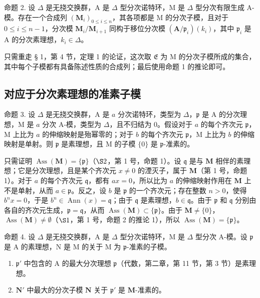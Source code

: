 命题 2. 设 \(\Delta\) 是无挠交换群，A 是 \(\Delta\) 型分次诺特环，M 是 \(\Delta\) 型分次有限生成 A-模。存在一个合成列 \((\mathbf{M}_i)_{0 \leqslant i \leqslant n}\)，其各项都是 M 的分次子模，且对于 \(0 \leqslant i \leqslant n - 1\)，分次模 \(\mathbf{M}_i / \mathbf{M}_{i+1}\) 同构于移位分次模 \((\mathbf{A} / \mathfrak{p}_i)(k_i)\)，其中 \(\mathfrak{p}_i\) 是 A 的分次素理想，\(k_i \in \Delta\)。

只需重走 § 1，第 4 节，定理 1 的论证，这次取 \(\mathfrak{E}\) 为 M 的分次子模所成的集合，其中每个子模都有具备陈述性质的合成列；最后使用命题 1 的推论即可。

\subsection{对应于分次素理想的准素子模}

命题 3. 设 \(\Delta\) 是无挠交换群，A 是 \(a\) 分次诺特环，类型为 \(\Delta\)，\(\mathfrak{p}\) 是 A 的分次理想，M 是 \(a\) 分次 A-模，类型为 \(\Delta\)，且不归结为 0。假设对于 \(a\) 的每个齐次元 \(\mathfrak{p}\)，M 上比为 \(a\) 的伸缩映射是殆幂零的；对于 \(b\) 的每个齐次元 \(\mathfrak{p}\)，M 上比为 \(b\) 的伸缩映射是单射。则 \(\mathfrak{p}\) 是素理想，且 M 的子模 \(\{0\}\) 是 \(\mathfrak{p}\)-准素的。

只需证明 \(\operatorname{Ass}(\mathbf{M}) = \{\mathfrak{p}\}\)（\(\S 2\)，第 1 号，命题 1）。设 \(\mathfrak{q}\) 是与 \(\mathbf{M}\) 相伴的素理想；它是分次理想，且是某个齐次元 \(x \neq 0\) 的湮灭子，属于 \(\mathbf{M}\)（第 1 号，命题 1）。对于 \(a\) 的每个齐次元 \(\mathfrak{q}\)，都有 \(ax = 0\)，所以比为 \(a\) 的伸缩映射作用在 \(\mathbf{M}\) 上不是单射，从而 \(a \in \mathfrak{p}\)。反之，设 \(b\) 是 \(\mathfrak{p}\) 的一个齐次元；存在整数 \(n > 0\)，使得 \(b^n x = 0\)，于是 \(b^n \in \operatorname{Ann}(x) = \mathfrak{q}\)；由于 \(\mathfrak{q}\) 是素理想，\(b \in \mathfrak{q}\)。由于 \(\mathfrak{p}\) 和 \(\mathfrak{q}\) 分别由各自的齐次元生成，\(\mathfrak{p} = \mathfrak{q}\)，从而 \(\operatorname{Ass}(\mathbf{M}) \subset \{\mathfrak{p}\}\)。由于 \(\mathbf{M} \neq \{0\}\)，\(\operatorname{Ass}(\mathbf{M}) \neq \emptyset\)（\(\S 1\)，第 1 号，命题 2 的推论 1），所以 \(\operatorname{Ass}(\mathbf{M}) = \{\mathfrak{p}\}\)。

命题 4. 设 \(\Delta\) 是无挠交换群，A 是 \(\Delta\) 型分次诺特环，M 是 \(\Delta\) 型分次 A-模。设 \(\mathfrak{p}\) 是 A 的素理想，N 是 M 的关于 M 为 \(\mathfrak{p}\)-准素的子模。

\begin{enumerate}
\def\labelenumi{(\roman{enumi})}
\item
  \(\mathfrak{p}'\) 中包含的 A 的最大分次理想 \(\mathfrak{p}\)（代数，第二章，第 11 节，第 3 节）是素理想。
\item
  \(\mathbf{N}'\) 中最大的分次子模 \(\mathbf{N}\) 关于 \(\mathfrak{p}'\) 是 \(\mathbf{M}\)-准素的。
\end{enumerate}

